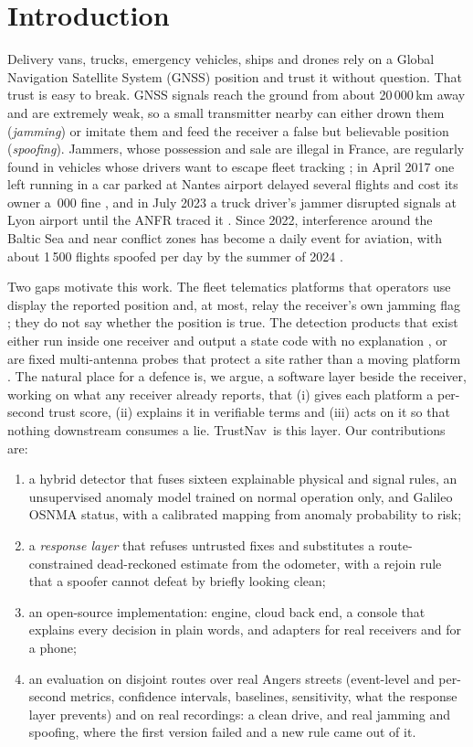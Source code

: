 \documentclass[conference]{IEEEtran}
\newcommand{\sys}{TrustNav}
\begin{document}
\section{Introduction}
Delivery vans, trucks, emergency vehicles, ships and drones rely on a Global Navigation Satellite System (GNSS) position and trust it without question. That trust is easy to break. GNSS signals reach the ground from about 20\,000\,km away and are extremely weak, so a small transmitter nearby can either drown them (\emph{jamming}) or imitate them and feed the receiver a false but believable position (\emph{spoofing}). Jammers, whose possession and sale are illegal in France, are regularly found in vehicles whose drivers want to escape fleet tracking \cite{anfr2024}; in April 2017 one left running in a car parked at Nantes airport delayed several flights and cost its owner a \,000 fine \cite{rntf2017}, and in July 2023 a truck driver's jammer disrupted signals at Lyon airport until the ANFR traced it \cite{transinfo2023}. Since 2022, interference around the Baltic Sea and near conflict zones has become a daily event for aviation, with about 1\,500 flights spoofed per day by the summer of 2024 \cite{eucouncil2025,opsgroup2024}.

Two gaps motivate this work. The fleet telematics platforms that operators use display the reported position and, at most, relay the receiver's own jamming flag \cite{geotab2025}; they do not say whether the position is true. The detection products that exist either run inside one receiver and output a state code with no explanation \cite{ublox2024,septentrio2025}, or are fixed multi-antenna probes that protect a site rather than a moving platform \cite{gpspatron}. The natural place for a defence is, we argue, a software layer beside the receiver, working on what any receiver already reports, that (i) gives each platform a per-second trust score, (ii) explains it in verifiable terms and (iii) acts on it so that nothing downstream consumes a lie. \sys\ is this layer. Our contributions are:
\begin{enumerate}
\item a hybrid detector that fuses sixteen explainable physical and signal rules, an unsupervised anomaly model trained on normal operation only, and Galileo OSNMA status, with a calibrated mapping from anomaly probability to risk;
\item a \emph{response layer} that refuses untrusted fixes and substitutes a route-constrained dead-reckoned estimate from the odometer, with a rejoin rule that a spoofer cannot defeat by briefly looking clean;
\item an open-source implementation: engine, cloud back end, a console that explains every decision in plain words, and adapters for real receivers and for a phone;
\item an evaluation on disjoint routes over real Angers streets (event-level and per-second metrics, confidence intervals, baselines, sensitivity, what the response layer prevents) and on real recordings: a clean drive, and real jamming and spoofing, where the first version failed and a new rule came out of it.
\end{enumerate}
\end{document}
